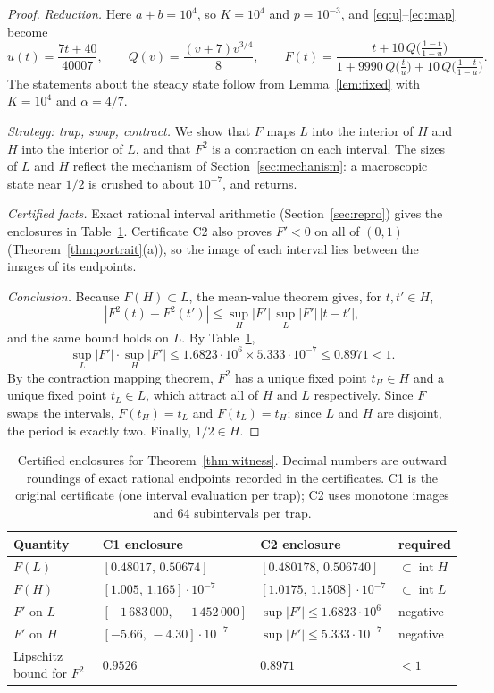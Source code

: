 \documentclass[11pt,a4paper]{article}
\theoremstyle{plain}
\theoremstyle{definition}
\begin{document}
\begin{proof}
\emph{Reduction.} Here $a+b=10^4$, so $K=10^4$ and $p=10^{-3}$, and \eqref{eq:u}--\eqref{eq:map} become
\[
 u(t)=\frac{7t+40}{40007},\qquad Q(v)=\frac{(v+7)v^{3/4}}8,\qquad F(t)=\frac{t+10\,Q\bigl(\frac{1-t}{1-u}\bigr)}{1+9990\,Q\bigl(\frac tu\bigr)+10\,Q\bigl(\frac{1-t}{1-u}\bigr)}.
\]
The statements about the steady state follow from Lemma~\ref{lem:fixed} with $K=10^4$ and $\alpha=4/7$.

\emph{Strategy: trap, swap, contract.} We show that $F$ maps $L$ into the interior of $H$ and $H$ into the interior of $L$, and that $F^2$ is a contraction on each interval. The sizes of $L$ and $H$ reflect the mechanism of Section~\ref{sec:mechanism}: a macroscopic state near $1/2$ is crushed to about $10^{-7}$, and returns.

\emph{Certified facts.} Exact rational interval arithmetic (Section~\ref{sec:repro}) gives the enclosures in Table~\ref{tab:certificate}. Certificate C2 also proves $F'<0$ on all of $(0,1)$ (Theorem~\ref{thm:portrait}(a)), so the image of each interval lies between the images of its endpoints.

\emph{Conclusion.} Because $F(H)\subset L$, the mean-value theorem gives, for $t,t'\in H$,
\[
 |F^2(t)-F^2(t')|\le\sup_H|F'|\,\sup_L|F'|\,|t-t'|,
\]
and the same bound holds on $L$. By Table~\ref{tab:certificate},
\[
 \sup_L|F'|\cdot\sup_H|F'|\le 1.6823\cdot10^{6}\times5.333\cdot10^{-7}\le 0.8971<1 .
\]
By the contraction mapping theorem, $F^2$ has a unique fixed point $t_H\in H$ and a unique fixed point $t_L\in L$, which attract all of $H$ and $L$ respectively. Since $F$ swaps the intervals, $F(t_H)=t_L$ and $F(t_L)=t_H$; since $L$ and $H$ are disjoint, the period is exactly two. Finally, $1/2\in H$.
\end{proof}

\begin{table}[ht]
\centering\small
\caption{Certified enclosures for Theorem~\ref{thm:witness}. Decimal numbers are outward roundings of exact rational endpoints recorded in the certificates. C1 is the original certificate (one interval evaluation per trap); C2 uses monotone images and 64 subintervals per trap.}\label{tab:certificate}
\begin{tabular}{llll}
\toprule
Quantity & C1 enclosure & C2 enclosure & required\\
\midrule
$F(L)$ & $[0.48017,\,0.50674]$ & $[0.480178,\,0.506740]$ & $\subset\operatorname{int}H$\\
$F(H)$ & $[1.005,\,1.165]\cdot10^{-7}$ & $[1.0175,\,1.1508]\cdot10^{-7}$ & $\subset\operatorname{int}L$\\
$F'$ on $L$ & $[-1\,683\,000,\,-1\,452\,000]$ & $\sup|F'|\le1.6823\cdot10^{6}$ & negative\\
$F'$ on $H$ & $[-5.66,\,-4.30]\cdot10^{-7}$ & $\sup|F'|\le5.333\cdot10^{-7}$ & negative\\
Lipschitz bound for $F^2$ & $0.9526$ & $0.8971$ & $<1$\\
\bottomrule
\end{tabular}
\end{table}
\end{document}
